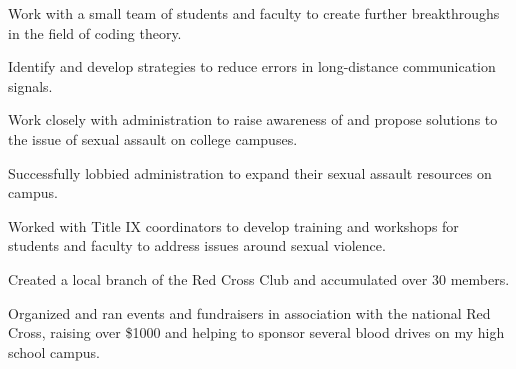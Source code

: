 \documentclass{resume}
\begin{document}
\begin{minipage}[t]{0.66\textwidth}
\begin{tightemize}
\item Work with a small team of students and faculty to create further breakthroughs in the field of coding theory.
\item Identify and develop strategies to reduce errors in long-distance communication signals.
\end{tightemize}
\sectionsep

\begin{tightemize}
\item Work closely with administration to raise awareness of and propose solutions to the issue of sexual assault on college campuses.
\item Successfully lobbied administration to expand their sexual assault resources on campus.
\item Worked with Title IX coordinators to develop training and workshops for students and faculty to address issues around sexual violence.
\end{tightemize}
\sectionsep


\begin{tightemize}
\item Created a local branch of the Red Cross Club and accumulated over 30 members. 
\item Organized and ran events and fundraisers in association with the national Red Cross, raising over \$1000 and helping to sponsor several blood drives on my high school campus. 
\end{tightemize}
\sectionsep








\end{minipage}
\end{document}

